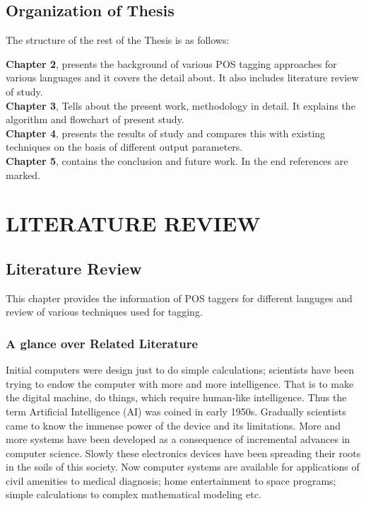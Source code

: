 \documentclass[12pt,a4paper,oneside]{memoir}
\begin{document}
\section{Organization of Thesis}
The structure of the rest of the Thesis is as follows:

\textbf{Chapter 2}, presents the background of various POS tagging approaches  for various languages and it covers the detail about. It also includes literature review of study. \\

\textbf{Chapter 3}, Tells about the present work, methodology in detail. It explains the algorithm and flowchart of present study.\\


\textbf{Chapter 4}, presents the results of study and compares this with existing techniques on the basis of different output parameters.\\

\textbf{Chapter 5}, contains the conclusion and future work. In the end references are marked.\\











\chapter{LITERATURE REVIEW}
\section{Literature Review}
This chapter provides the information of POS taggers for different languges and review of various techniques used for tagging.

\subsection{A glance over Related Literature}
Initial computers were design just to do simple calculations; scientists have been
trying to endow the computer with more and more intelligence. That is to make the
digital machine, do things, which require human-like intelligence. Thus the term
Artificial Intelligence (AI) was coined in early 1950s. Gradually scientists came to
know the immense power of the device and its limitations. More and more systems
have been developed as a consequence of incremental advances in computer science.
Slowly these electronics devices have been spreading their roots in the soils of this
society. Now computer systems are available for applications of civil amenities to
medical diagnosis; home entertainment to space programs; simple calculations to
complex mathematical modeling etc.
\end{document}
